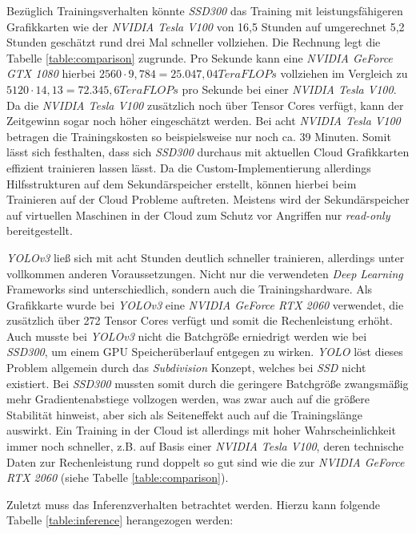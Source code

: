 Bezüglich Trainingsverhalten könnte \textit{SSD300} das Training mit leistungsfähigeren Grafikkarten wie der \textit{NVIDIA Tesla V100} von 16,5 Stunden auf umgerechnet 5,2 Stunden geschätzt rund drei Mal schneller vollziehen. Die Rechnung legt die Tabelle \ref{table:comparison} zugrunde. Pro Sekunde kann eine \textit{NVIDIA GeForce GTX 1080} hierbei $2560\cdot 9,784 = 25.047,04 TeraFLOPs$ vollziehen im Vergleich zu $5120\cdot 14,13 = 72.345,6 TeraFLOPs$ pro Sekunde bei einer \textit{NVIDIA Tesla V100}. Da die \textit{NVIDIA Tesla V100} zusätzlich noch über Tensor Cores verfügt, kann der Zeitgewinn sogar noch höher eingeschätzt werden. Bei acht \textit{NVIDIA Tesla V100} betragen die Trainingskosten so beispielsweise nur noch ca. 39 Minuten. Somit lässt sich festhalten, dass sich \textit{SSD300} durchaus mit aktuellen Cloud Grafikkarten effizient trainieren lassen lässt. Da die Custom-Implementierung allerdings Hilfsstrukturen auf dem Sekundärspeicher erstellt, können hierbei beim Trainieren auf der Cloud Probleme auftreten. Meistens wird der Sekundärspeicher auf virtuellen Maschinen in der Cloud zum Schutz vor Angriffen nur \textit{read-only} bereitgestellt. 

\textit{YOLOv3} ließ sich mit acht Stunden deutlich schneller trainieren, allerdings unter vollkommen anderen Voraussetzungen. Nicht nur die verwendeten \textit{Deep Learning} Frameworks sind unterschiedlich, sondern auch die Trainingshardware. Als Grafikkarte wurde bei \textit{YOLOv3} eine \textit{NVIDIA GeForce RTX 2060} verwendet, die zusätzlich über 272 Tensor Cores verfügt und somit die Rechenleistung erhöht. Auch musste bei \textit{YOLOv3} nicht die Batchgröße erniedrigt werden wie bei \textit{SSD300}, um einem GPU Speicherüberlauf entgegen zu wirken. \textit{YOLO} löst dieses Problem allgemein durch das \textit{Subdivision} Konzept, welches bei \textit{SSD} nicht existiert. Bei \textit{SSD300} mussten somit durch die geringere Batchgröße zwangsmäßig mehr Gradientenabstiege vollzogen werden, was zwar auch auf die größere Stabilität hinweist, aber sich als Seiteneffekt auch auf die Trainingslänge auswirkt. Ein Training in der Cloud ist allerdings mit hoher Wahrscheinlichkeit immer noch schneller, z.B. auf Basis einer \textit{NVIDIA Tesla V100}, deren technische Daten zur Rechenleistung rund doppelt so gut sind wie die zur \textit{NVIDIA GeForce RTX 2060} (siehe Tabelle \ref{table:comparison}). 

Zuletzt muss das Inferenzverhalten betrachtet werden. Hierzu kann folgende Tabelle \ref{table:inference} herangezogen werden:

